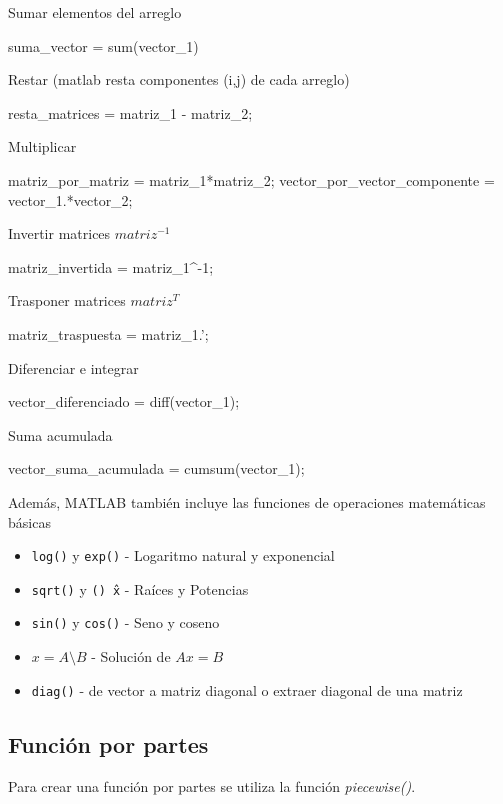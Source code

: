 Sumar elementos del arreglo
\begin{verbatimg}
    suma_vector = sum(vector_1)
\end{verbatimg}

Restar (matlab resta componentes (i,j) de cada arreglo)
\begin{verbatimg}
    resta_matrices = matriz_1 - matriz_2;
\end{verbatimg}

Multiplicar
\begin{verbatimg}
    matriz_por_matriz = matriz_1*matriz_2;
    vector_por_vector_componente = vector_1.*vector_2;
\end{verbatimg}

Invertir matrices $matriz^{-1}$
\begin{verbatimg}
    matriz_invertida = matriz_1^-1; %
\end{verbatimg}

Trasponer matrices $matriz^T$
\begin{verbatimg}
    matriz_traspuesta = matriz_1.';
\end{verbatimg}

Diferenciar e integrar
\begin{verbatimg}
    vector_diferenciado = diff(vector_1);
\end{verbatimg} 

Suma acumulada
\begin{verbatimg}
    vector_suma_acumulada = cumsum(vector_1);
\end{verbatimg}

\noindent Además, MATLAB también incluye las funciones de operaciones matemáticas básicas
\begin{itemize}
    \item \texttt{log()} y \texttt{exp()} - Logaritmo natural y exponencial
    \item \texttt{sqrt()} y \texttt{()\^ \ x} - Raíces y Potencias
    \item \texttt{sin()} y \texttt{cos()} - Seno y coseno
    \item $x = A\setminus B$ - Solución de $Ax = B$
    \item \texttt{diag()} - de vector a matriz diagonal o extraer diagonal de una matriz
\end{itemize}

\subsection{Función por partes}
Para crear una función por partes se utiliza la función \emph{piecewise()}.

